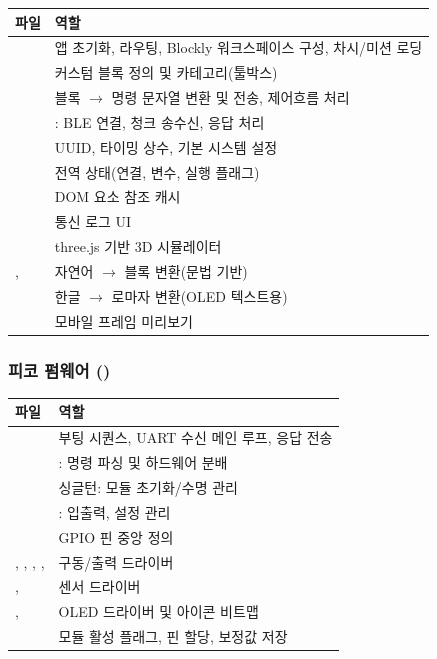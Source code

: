 \begin{longtable}{L{3.4cm} L{11.0cm}}
\toprule
{}\textbf{파일} & \textbf{역할} \\
\midrule
\endhead
{} & 앱 초기화, 라우팅, Blockly 워크스페이스 구성, 차시/미션 로딩 \\
 & 커스텀 블록 정의 및 카테고리(툴박스) \\
 & 블록 $\to$ 명령 문자열 변환 및 전송, 제어흐름 처리 \\
 & : BLE 연결, 청크 송수신, 응답 처리 \\
 & UUID, 타이밍 상수, 기본 시스템 설정 \\
 & 전역 상태(연결, 변수, 실행 플래그) \\
 & DOM 요소 참조 캐시 \\
 & 통신 로그 UI \\
 & three.js 기반 3D 시뮬레이터 \\
,  & 자연어 $\to$ 블록 변환(문법 기반) \\
 & 한글 $\to$ 로마자 변환(OLED 텍스트용) \\
 & 모바일 프레임 미리보기 \\
\bottomrule
\end{longtable}

\subsubsection{피코 펌웨어 ()}

\begin{longtable}{L{3.4cm} L{11.0cm}}
\toprule
{}\textbf{파일} & \textbf{역할} \\
\midrule
\endhead
{} & 부팅 시퀀스, UART 수신 메인 루프, 응답 전송 \\
 & : 명령 파싱 및 하드웨어 분배 \\
 &  싱글턴: 모듈 초기화/수명 관리 \\
 & :  입출력, 설정 관리 \\
 & GPIO 핀 중앙 정의 \\
, , , ,  & 구동/출력 드라이버 \\
,  & 센서 드라이버 \\
,  & OLED 드라이버 및 아이콘 비트맵 \\
 & 모듈 활성 플래그, 핀 할당, 보정값 저장 \\
\bottomrule
\end{longtable}

